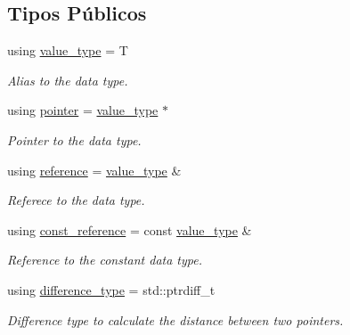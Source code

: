 \subsection*{Tipos Públicos}
\begin{DoxyCompactItemize}
\item 
\mbox{\label{classls_1_1my__iterator_aa67b52463c80c463dcb4919c3040903b}} 
using \hyperlink{classls_1_1my__iterator_aa67b52463c80c463dcb4919c3040903b}{value\+\_\+type} = T
\begin{DoxyCompactList}\small\item\em Alias to the data type. \end{DoxyCompactList}\item 
\mbox{\label{classls_1_1my__iterator_a65792c5672e5b22715ec2b58c32e016a}} 
using \hyperlink{classls_1_1my__iterator_a65792c5672e5b22715ec2b58c32e016a}{pointer} = \hyperlink{classls_1_1my__const__iterator_aa7aa8489a065e4ddda33727d33c84b7d}{value\+\_\+type} $\ast$
\begin{DoxyCompactList}\small\item\em Pointer to the data type. \end{DoxyCompactList}\item 
\mbox{\label{classls_1_1my__iterator_ad3b5d3648d5b83344888204a9e6d7bfa}} 
using \hyperlink{classls_1_1my__iterator_ad3b5d3648d5b83344888204a9e6d7bfa}{reference} = \hyperlink{classls_1_1my__const__iterator_aa7aa8489a065e4ddda33727d33c84b7d}{value\+\_\+type} \&
\begin{DoxyCompactList}\small\item\em Referece to the data type. \end{DoxyCompactList}\item 
\mbox{\label{classls_1_1my__iterator_a7a136fd439ffd4ed9d67a794d1001935}} 
using \hyperlink{classls_1_1my__iterator_a7a136fd439ffd4ed9d67a794d1001935}{const\+\_\+reference} = const \hyperlink{classls_1_1my__const__iterator_aa7aa8489a065e4ddda33727d33c84b7d}{value\+\_\+type} \&
\begin{DoxyCompactList}\small\item\em Reference to the constant data type. \end{DoxyCompactList}\item 
\mbox{\label{classls_1_1my__iterator_a706553fcf9e3ea711d454eb7604aae1e}} 
using \hyperlink{classls_1_1my__iterator_a706553fcf9e3ea711d454eb7604aae1e}{difference\+\_\+type} = std\+::ptrdiff\+\_\+t
\begin{DoxyCompactList}\small\item\em Difference type to calculate the distance between two pointers. \end{DoxyCompactList}\end{DoxyCompactItemize}
